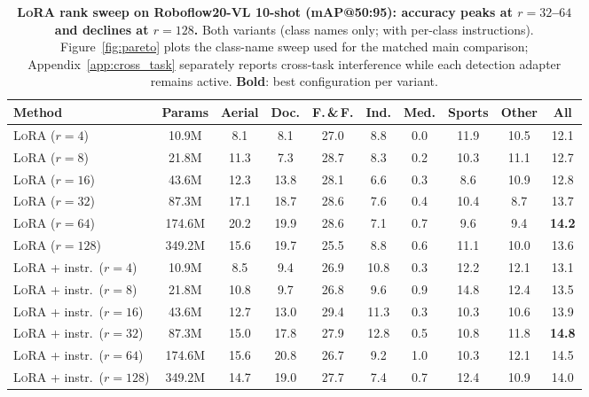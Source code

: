 \documentclass{article}
\newcommand{\lora}{\textsc{LoRA}}
\newcommand{\rftwenty}{Roboflow20-VL}
\newcommand{\best}[1]{\textbf{#1}}
\begin{document}
\begin{table}[h]
  \centering
  \caption{\textbf{\lora{} rank sweep on \rftwenty{} 10-shot (mAP@50:95): accuracy peaks at $r{=}32$--$64$ and declines at $r{=}128$.}
    Both variants (class names only; with per-class instructions).
    Figure~\ref{fig:pareto} plots the class-name sweep used for the matched
    main comparison; Appendix~\ref{app:cross_task} separately reports
    cross-task interference while each detection adapter remains active.
    \best{Bold}: best configuration per variant.}
  \label{tab:lora_full}
  \small
  \setlength{\tabcolsep}{4pt}
  \begin{tabular}{lcccccccc|c}
    \toprule
    \textbf{Method} & \textbf{Params} & \textbf{Aerial} & \textbf{Doc.}
                    & \textbf{F.\,\&\,F.} & \textbf{Ind.}
                    & \textbf{Med.} & \textbf{Sports}
                    & \textbf{Other} & \textbf{All} \\
    \midrule
    \lora{} ($r{=}4$)        &  10.9M &  8.1 &  8.1 & 27.0 &  8.8 &  0.0 & 11.9 & 10.5 & 12.1 \\
    \lora{} ($r{=}8$)        &  21.8M & 11.3 &  7.3 & 28.7 &  8.3 &  0.2 & 10.3 & 11.1 & 12.7 \\
    \lora{} ($r{=}16$)       &  43.6M & 12.3 & 13.8 & 28.1 &  6.6 &  0.3 &  8.6 & 10.9 & 12.8 \\
    \lora{} ($r{=}32$)       &  87.3M & 17.1 & 18.7 & 28.6 &  7.6 &  0.4 & 10.4 &  8.7 & 13.7 \\
    \lora{} ($r{=}64$)       & 174.6M & 20.2 & 19.9 & 28.6 &  7.1 &  0.7 &  9.6 &  9.4 & \best{14.2} \\
    \lora{} ($r{=}128$)      & 349.2M & 15.6 & 19.7 & 25.5 &  8.8 &  0.6 & 11.1 & 10.0 & 13.6 \\
    \midrule
    \lora{} + instr.\ ($r{=}4$)   &  10.9M &  8.5 &  9.4 & 26.9 & 10.8 &  0.3 & 12.2 & 12.1 & 13.1 \\
    \lora{} + instr.\ ($r{=}8$)   &  21.8M & 10.8 &  9.7 & 26.8 &  9.6 &  0.9 & 14.8 & 12.4 & 13.5 \\
    \lora{} + instr.\ ($r{=}16$)  &  43.6M & 12.7 & 13.0 & 29.4 & 11.3 &  0.3 & 10.3 & 10.6 & 13.9 \\
    \lora{} + instr.\ ($r{=}32$)  &  87.3M & 15.0 & 17.8 & 27.9 & 12.8 &  0.5 & 10.8 & 11.8 & \best{14.8} \\
    \lora{} + instr.\ ($r{=}64$)  & 174.6M & 15.6 & 20.8 & 26.7 &  9.2 &  1.0 & 10.3 & 12.1 & 14.5 \\
    \lora{} + instr.\ ($r{=}128$) & 349.2M & 14.7 & 19.0 & 27.7 &  7.4 &  0.7 & 12.4 & 10.9 & 14.0 \\
    \bottomrule
  \end{tabular}
\end{table}
\end{document}
